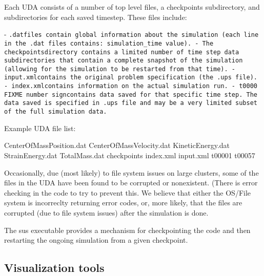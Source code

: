 Each UDA consists of a number of top level files, a checkpoints
subdirectory, and subdirectories for each saved timestep.  These files
include:

- \tt.dat\normalfont files contain global information about the simulation
(each line in the .dat files contains: simulation\_time value).
- The \tt checkpoints\normalfont directory contains a limited number of time
step data subdirectories that contain a complete snapshot of the
simulation (allowing for the simulation to be restarted from that
time).
- \tt input.xml\normalfont contains the original problem specification (the
.ups file).
- \tt index.xml\normalfont contains information on the actual simulation run.
- \tt t0000 FIXME number sign\normalfont contains data saved for that specific time step.  The
data saved is specified in .ups file and may be a very limited subset
of the full simulation data.

Example UDA file list:

CenterOfMassPosition.dat
CenterOfMassVelocity.dat
KineticEnergy.dat
StrainEnergy.dat
TotalMass.dat
checkpoints
index.xml
input.xml
t00001
t00057


Occasionally, due (most likely) to file system issues on large
clusters, some of the files in the UDA have been found to be corrupted
or nonexistent.  (There is error checking in the code to try to
prevent this.  We believe that either the OS/File system is
incorreclty returning error codes, or, more likely, that the files are
corrupted (due to file system issues) after the simulation is done.


The sus executable provides a mechanism for checkpointing the code and
then restarting the ongoing simulation from a given checkpoint. 



\subsection{Visualization tools}

